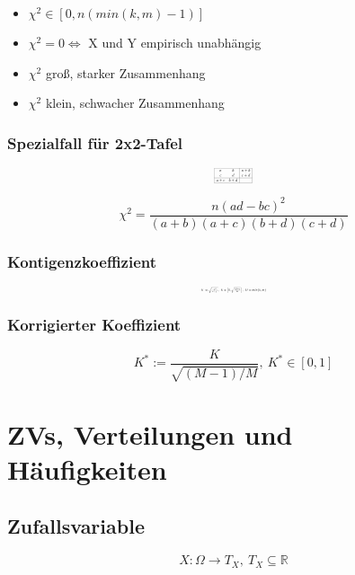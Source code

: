 \documentclass[10pt,a4paper,landscape]{article}
\begin{document}
\begin{multicols}{4}
\begin{itemize}
\item $\chi^2 \in [0, n(min(k,m)-1)]$
\item $\chi^2=0 \Leftrightarrow$ X und Y empirisch unabhängig
\item $\chi^2$ groß, starker Zusammenhang
\item $\chi^2$ klein, schwacher Zusammenhang
\end{itemize}

\subsubsection*{Spezialfall für 2x2-Tafel}
\[ \resizebox{0.09\textwidth}{!}{$
\begin{array}{|cc|c|}
\hline
a & b & a+b \\
c & d & c+d \\
\hline
a+c & b+d & \\
\hline
\end{array}
$}
\]

\[
\chi^2 = \frac{n(ad-bc)^2}{(a+b)(a+c)(b+d)(c+d)}
\]

\subsubsection*{Kontigenzkoeffizient}
\[ \resizebox{0.15\textwidth}{!}{$
K := \sqrt{\frac{\chi^2}{n+\chi^2}}, ~K \in \left[0, \sqrt{\frac{M-1}{M}}\right],~ M=min\{k, m\}
$}
\]

\subsubsection*{Korrigierter Koeffizient}
\[
K^* := \frac{K}{\sqrt{(M-1)/M}}, ~ K^* \in [0, 1]
\]


\section{ZVs, Verteilungen und Häufigkeiten}

\subsection{Zufallsvariable}
\[
X:\Omega \rightarrow T_X , ~ T_X\subseteq \mathbb{R}
\]


\end{multicols}
\end{document}
